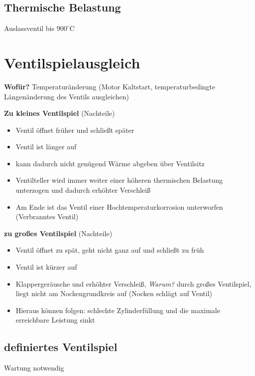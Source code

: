 \subsection{Thermische Belastung}\label{thermische-belastung}

Auslassventil bis $900^\circ\text{C}$

\section{Ventilspielausgleich}\label{ventilspielausgleich}

\textbf{Wofür?} Temperaturänderung (Motor Kaltstart, temperaturbedingte
Längenänderung des Ventils ausgleichen)

\textbf{Zu kleines Ventilspiel} (Nachteile)

\begin{itemize}
\item
  Ventil öffnet früher und schließt später
\item
  Ventil ist länger auf
\item
  kann dadurch nicht genügend Wärme abgeben über Ventilsitz
\item
  Ventilteller wird immer weiter einer höheren thermischen Belastung
  unterzogen und dadurch erhöhter Verschleiß
\item
  Am Ende ist das Ventil einer Hochtemperaturkorrosion unterworfen
  (Verbranntes Ventil)
\end{itemize}

\textbf{zu großes Ventilspiel} (Nachteile)

\begin{itemize}
\item
  Ventil öffnet zu spät, geht nicht ganz auf und schließt zu früh
\item
  Ventil ist kürzer auf
\item
  Klappergeräusche und erhöhter Verschleiß, \emph{Warum?} durch großes
  Ventilspiel, liegt nicht am Nockengrundkreis auf (Nocken schlägt auf
  Ventil)
\item
  Hieraus können folgen: schlechte Zylinderfüllung und die maximale
  erreichbare Leistung sinkt
\end{itemize}

\subsection{definiertes Ventilspiel}\label{definiertes-ventilspiel}

Wartung notwendig

